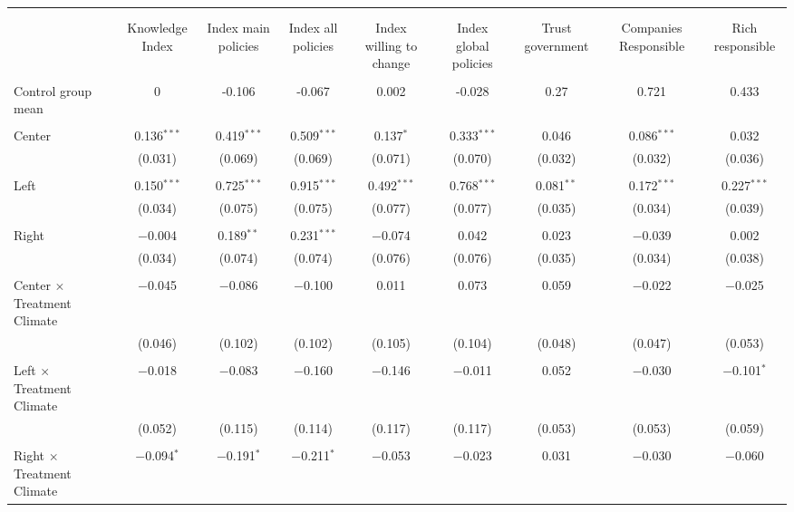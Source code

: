 
\begin{tabular}{@{\extracolsep{5pt}}lcccccccc} 
\\[-1.8ex]\hline 
\hline \\[-1.8ex] 
\\[-1.8ex] & Knowledge Index & Index main policies & Index all policies & Index willing to change & Index global policies & Trust government & Companies Responsible & Rich responsible \\ 
\hline \\[-1.8ex] 
 Control group mean & 0 & -0.106 & -0.067 & 0.002 & -0.028 & 0.27 & 0.721 & 0.433  \\ \hline \\[-1.8ex] Center & 0.136$^{***}$ & 0.419$^{***}$ & 0.509$^{***}$ & 0.137$^{*}$ & 0.333$^{***}$ & 0.046 & 0.086$^{***}$ & 0.032 \\ 
  & (0.031) & (0.069) & (0.069) & (0.071) & (0.070) & (0.032) & (0.032) & (0.036) \\ 
  & & & & & & & & \\ 
 Left & 0.150$^{***}$ & 0.725$^{***}$ & 0.915$^{***}$ & 0.492$^{***}$ & 0.768$^{***}$ & 0.081$^{**}$ & 0.172$^{***}$ & 0.227$^{***}$ \\ 
  & (0.034) & (0.075) & (0.075) & (0.077) & (0.077) & (0.035) & (0.034) & (0.039) \\ 
  & & & & & & & & \\ 
 Right & $-$0.004 & 0.189$^{**}$ & 0.231$^{***}$ & $-$0.074 & 0.042 & 0.023 & $-$0.039 & 0.002 \\ 
  & (0.034) & (0.074) & (0.074) & (0.076) & (0.076) & (0.035) & (0.034) & (0.038) \\ 
  & & & & & & & & \\ 
 Center $\times$ Treatment Climate & $-$0.045 & $-$0.086 & $-$0.100 & 0.011 & 0.073 & 0.059 & $-$0.022 & $-$0.025 \\ 
  & (0.046) & (0.102) & (0.102) & (0.105) & (0.104) & (0.048) & (0.047) & (0.053) \\ 
  & & & & & & & & \\ 
 Left $\times$ Treatment Climate & $-$0.018 & $-$0.083 & $-$0.160 & $-$0.146 & $-$0.011 & 0.052 & $-$0.030 & $-$0.101$^{*}$ \\ 
  & (0.052) & (0.115) & (0.114) & (0.117) & (0.117) & (0.053) & (0.053) & (0.059) \\ 
  & & & & & & & & \\ 
 Right $\times$ Treatment Climate & $-$0.094$^{*}$ & $-$0.191$^{*}$ & $-$0.211$^{*}$ & $-$0.053 & $-$0.023 & 0.031 & $-$0.030 & $-$0.060 \\ 

\end{tabular}
